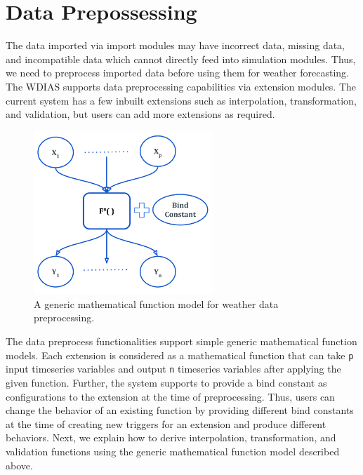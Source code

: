 \section{Data Prepossessing}
\label{se:data_preprocess}

The data imported via import modules may have incorrect data, missing data, and incompatible data which cannot directly feed into simulation modules.
Thus, we need to preprocess imported data before using them for weather forecasting. The WDIAS supports data preprocessing capabilities via extension modules. The current system has a few inbuilt extensions such as interpolation, transformation, and validation, but users can add more extensions as required.

\begin{figure}[htp]
    \centering
    \includegraphics[width=0.6\textwidth]{method/data_preprocess/weather_data_preprocessing.pdf}
    \caption{A generic mathematical function model for weather data preprocessing.}
    \label{fi:weather_data_preprocessing}
\end{figure}

The data preprocess functionalities support simple generic mathematical function models. Each extension is considered as a mathematical function that can take \texttt{p} input timeseries variables and output \texttt{n} timeseries variables after applying the given function. Further, the system supports to provide a bind constant as configurations to the extension at the time of preprocessing. Thus, users can change the behavior of an existing function by providing different bind constants at the time of creating new triggers for an extension and produce different behaviors. Next, we explain how to derive interpolation, transformation, and validation functions using the generic mathematical function model described above.

